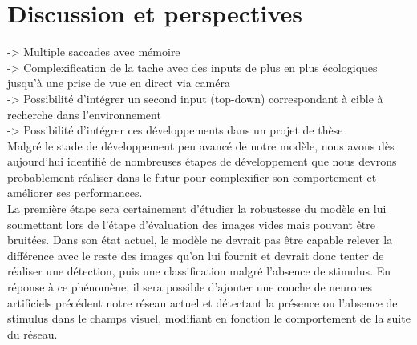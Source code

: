 
\chapter{Discussion et perspectives} %

\label{Discussion} %


-> Multiple saccades avec mémoire \\
-> Complexification de la tache avec des inputs de plus en plus écologiques jusqu'à une prise de vue en direct via caméra \\
-> Possibilité d'intégrer un second input (top-down) correspondant à cible à recherche dans l'environnement \\
-> Possibilité d'intégrer ces développements dans un projet de thèse \\

Malgré le stade de développement peu avancé de notre modèle, nous avons dès aujourd'hui identifié de nombreuses étapes de développement que nous devrons probablement réaliser dans le futur pour complexifier son comportement et améliorer ses performances. \\
La première étape sera certainement d'étudier la robustesse du modèle en lui soumettant lors de l'étape d'évaluation des images vides mais pouvant être bruitées.
Dans son état actuel, le modèle ne devrait pas être capable relever la différence avec le reste des images qu'on lui fournit et devrait donc tenter de réaliser une détection, puis une classification malgré l'absence de stimulus.
En réponse à ce phénomène, il sera possible d'ajouter une couche de neurones artificiels précédent notre réseau actuel et détectant la présence ou l'absence de stimulus dans le champs visuel, modifiant en fonction le comportement de la suite du réseau. \\